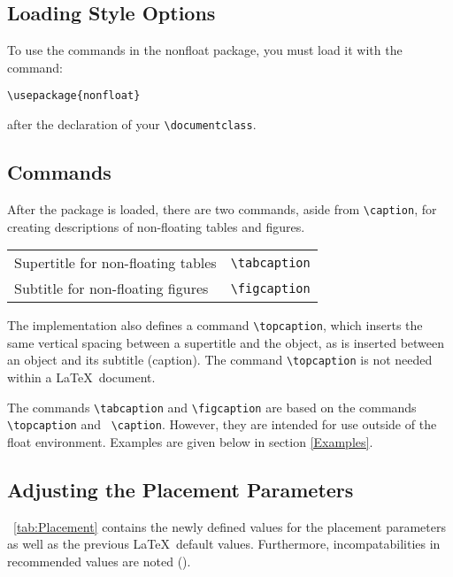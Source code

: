 \documentclass{article}
\begin{document}
\subsection{Loading Style Options}

To use the commands in the \textsf{nonfloat} package, you must load it with the command:

\vskip 6pt
\verb|\usepackage{nonfloat}|
\vskip 6pt

\noindent after the declaration of your \verb|\documentclass|.

\subsection{Commands}
After the package is loaded, there are two commands, aside from \verb|\caption|, for creating descriptions of non-floating tables and figures.

\vskip 1pc
\begin{minipage}{\linewidth}
\centering%
%
\label{tab:Commands}%
\begin{tabular}{*{2}{l}}
  Supertitle for non-floating tables & \verb|\tabcaption|\\
  Subtitle for non-floating figures  & \verb|\figcaption|
\end{tabular}
\end{minipage}
\vskip 1pc

The implementation also defines a command \verb|\topcaption|, which inserts the same
vertical spacing between a supertitle and the object, as is inserted between an object and its subtitle (caption). The command \verb|\topcaption| is not needed within a \LaTeX\ document.

The commands \verb|\tabcaption| and \verb|\figcaption| are based on the commands
\verb|\topcaption| and \ \verb|\caption|. However, they are intended for use outside of the float environment. Examples are given below in section \ref{Examples}.

\subsection{Adjusting the Placement Parameters}
\tablename~\ref{tab:Placement} contains the newly defined values for the placement parameters as well as the previous \LaTeX\ default values. Furthermore, incompatabilities in recommended values are noted (\cite{epslatex}).
\end{document}
